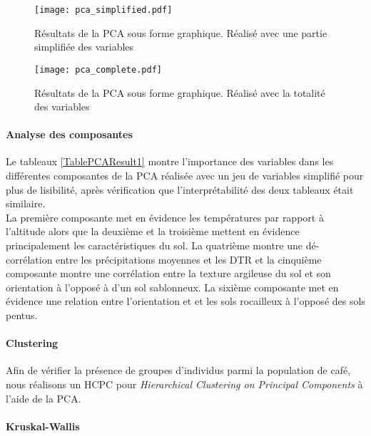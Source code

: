 \begin{figure}[H]
	\texttt{[image: pca\_simplified.pdf]}
	\caption{\label{FigurePCAResult2} Résultats de la PCA sous forme graphique. Réalisé avec une partie simplifiée des variables }
\end{figure}

\begin{figure}[H]
	\texttt{[image: pca\_complete.pdf]}
	\caption{\label{FigurePCAResult1} Résultats de la PCA sous forme graphique. Réalisé avec la totalité des variables }
\end{figure}


\paragraph{Analyse des composantes} Le tableaux \ref{TablePCAResult1} montre l'importance des variables dans les différentes composantes de la PCA réalisée avec un  jeu de variables simplifié pour plus de lisibilité, après vérification que l'interprétabilité des deux tableaux était similaire. \\

\noindent La première composante met en évidence les températures par rapport à l'altitude alors que la deuxième et la troisième mettent en évidence principalement les caractéristiques du sol. La quatrième montre une dé-corrélation entre les précipitations moyennes et les DTR et la cinquième composante montre une corrélation entre la texture argileuse du sol et son orientation à l'opposé à d'un sol sablonneux. La sixième composante met en évidence une relation entre l'orientation et et les sols rocailleux à l'opposé des sols pentus. 




\paragraph{Clustering} Afin de vérifier la présence de groupes d'individus parmi la population de café, nous réalisons un HCPC pour \textit{Hierarchical Clustering on Principal Components} à l'aide de la PCA. 

\paragraph{Kruskal-Wallis}







